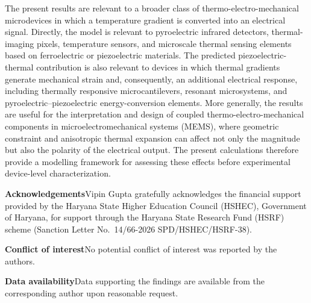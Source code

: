 \documentclass[a4paper, 11pt, twoside]{article}
\begin{document}
The present results are relevant to a broader class of thermo-electro-mechanical
microdevices in which a temperature gradient is converted into an electrical signal.
Directly, the model is relevant to pyroelectric infrared detectors, thermal-imaging
pixels, temperature sensors, and microscale thermal sensing elements based on
ferroelectric or piezoelectric materials. The predicted piezoelectric-thermal
contribution is also relevant to devices in which thermal gradients generate mechanical
strain and, consequently, an additional electrical response, including thermally
responsive microcantilevers, resonant microsystems, and pyroelectric--piezoelectric
energy-conversion elements. More generally, the results are useful for the
interpretation and design of coupled thermo-electro-mechanical components in
microelectromechanical systems (MEMS), where geometric constraint and anisotropic
thermal expansion can affect not only the magnitude but also the polarity of the
electrical output. The present calculations therefore provide a modelling framework
for assessing these effects before experimental device-level characterization.

\vspace{.4cm}
\footnotesize
\noindent\textbf{Acknowledgements}\quad Vipin Gupta gratefully acknowledges the financial support provided by the Haryana State Higher Education Council (HSHEC), Government of Haryana, for support through the Haryana State Research Fund (HSRF) scheme (Sanction Letter No.~14/66-2026 SPD/HSHEC/HSRF-38).

\vspace{2mm}
\noindent\textbf{Conflict of interest}\quad No potential conflict of interest was reported by the authors.

\vspace{2mm}
\noindent\textbf{Data availability}\quad Data supporting the findings are available from the corresponding author upon reasonable request.



\end{document}
